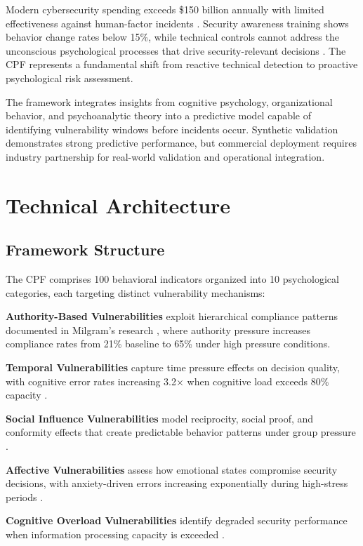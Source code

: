 \documentclass[10pt,twocolumn]{IEEEtran}
\begin{document}
Modern cybersecurity spending exceeds \$150 billion annually with limited effectiveness against human-factor incidents \cite{gartner2023}. Security awareness training shows behavior change rates below 15\%, while technical controls cannot address the unconscious psychological processes that drive security-relevant decisions \cite{sans2023}. The CPF represents a fundamental shift from reactive technical detection to proactive psychological risk assessment.

The framework integrates insights from cognitive psychology, organizational behavior, and psychoanalytic theory into a predictive model capable of identifying vulnerability windows before incidents occur. Synthetic validation demonstrates strong predictive performance, but commercial deployment requires industry partnership for real-world validation and operational integration.

\section{Technical Architecture}

\subsection{Framework Structure}

The CPF comprises 100 behavioral indicators organized into 10 psychological categories, each targeting distinct vulnerability mechanisms:

\textbf{Authority-Based Vulnerabilities} exploit hierarchical compliance patterns documented in Milgram's research \cite{milgram1974}, where authority pressure increases compliance rates from 21\% baseline to 65\% under high pressure conditions.

\textbf{Temporal Vulnerabilities} capture time pressure effects on decision quality, with cognitive error rates increasing 3.2× when cognitive load exceeds 80\% capacity \cite{kahneman2011}.

\textbf{Social Influence Vulnerabilities} model reciprocity, social proof, and conformity effects that create predictable behavior patterns under group pressure \cite{cialdini2007}.

\textbf{Affective Vulnerabilities} assess how emotional states compromise security decisions, with anxiety-driven errors increasing exponentially during high-stress periods \cite{damasio1994}.

\textbf{Cognitive Overload Vulnerabilities} identify degraded security performance when information processing capacity is exceeded \cite{miller1956}.
\end{document}
